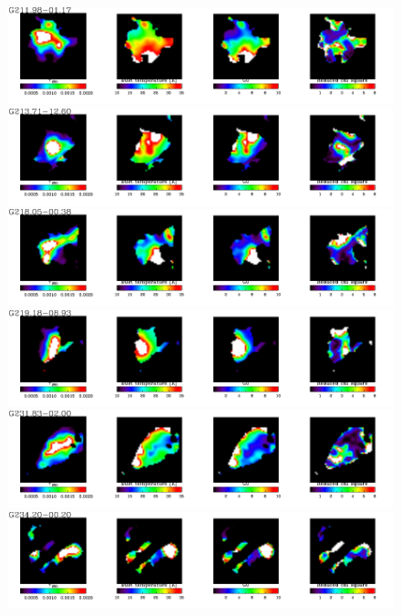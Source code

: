   \begin{figure}
\centering
\includegraphics[trim=0 2mm 0 0, clip, width=190mm]{appA/appA_54.pdf}
\includegraphics[trim=0 2mm 0 0, clip, width=190mm]{appA/appA_55.pdf}
\includegraphics[trim=0 2mm 0 0, clip, width=190mm]{appA/appA_56.pdf}
\includegraphics[trim=0 2mm 0 0, clip, width=190mm]{appA/appA_57.pdf}
\includegraphics[trim=0 2mm 0 0, clip, width=190mm]{appA/appA_58.pdf}
\includegraphics[trim=0 2mm 0 0, clip, width=190mm]{appA/appA_59.pdf}
  \end{figure}
  
